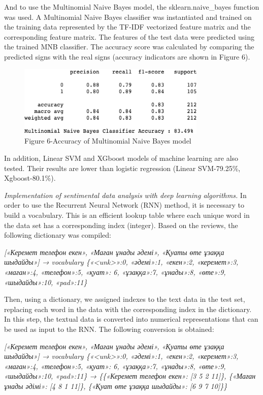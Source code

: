 And to use the Multinomial Naive Bayes model, the sklearn.naive\_bayes
function was used. A Multinomial Naive Bayes classifier was instantiated
and trained on the training data represented by the TF-IDF vectorized
feature matrix and the corresponding feature matrix. The features of the
test data were predicted using the trained MNB classifier. The accuracy
score was calculated by comparing the predicted signs with the real
signs (accuracy indicators are shown in Figure 6).

\begin{figure}[H]
	\centering
	\includegraphics[width=0.8\textwidth]{media/ict/image13}
	\caption*{Figure 6-Accuracy of Multinomial Naive Bayes model}
\end{figure}

In addition, Linear SVM and XGboost models of machine learning are also
tested. Their results are lower than logistic regression (Linear
SVM-79.25\%, Xgboost-80.1\%).

\emph{Implementation of sentimental data analysis with deep learning
algorithms.} In order to use the Recurrent Neural Network (RNN) method,
it is necessary to build a vocabulary. This is an efficient lookup table
where each unique word in the data set has a corresponding index
(integer). Based on the reviews, the following dictionary was compiled:

\emph{{[}«Керемет телефон екен», «Маған ұнады әдемі», «Қуаты өте ұзаққа
шыдайды»{]} → vocabulary \{«\textless unk\textgreater»:0, «әдемі»:1,
«екен»:2, «керемет»:3, «маған»:4, «телефон»:5, «қуат»: 6, «ұзаққа»:7,
«ұнады»:8, «өте»:9, «шыдайды»:10, «pad»:11\}}

Then, using a dictionary, we assigned indexes to the text data in the
test set, replacing each word in the data with the corresponding index
in the dictionary. In this step, the textual data is converted into
numerical representations that can be used as input to the RNN. The
following conversion is obtained:

\emph{{[}«Керемет телефон екен», «Маған ұнады әдемі», «Қуаты өте ұзаққа
шыдайды»{]} → vocabulary \{«\textless unk\textgreater»:0, «әдемі»:1,
«екен»:2, «керемет»:3, «маған»:4, «телефон»:5, «қуат»: 6, «ұзаққа»:7,
«ұнады»:8, «өте»:9, «шыдайды»:10, «pad»:11\} → \{\{«Керемет телефон
екен»: {[}3 5 2 11{]}\}, \{«Маған ұнады әдімі»: {[}4 8 1 11{]}\},
\{«Қуат өте ұзаққа шыдайды»: {[}6 9 7 10{]}\}\}}

